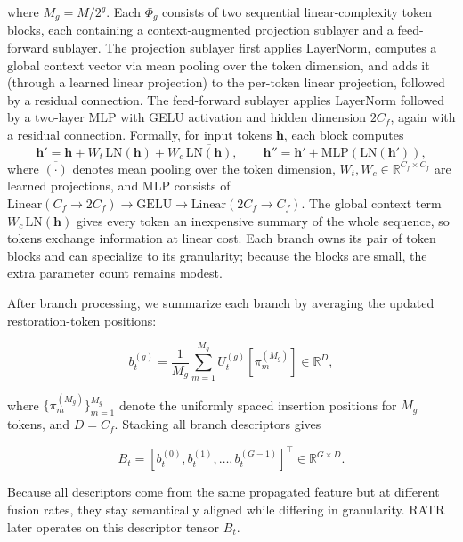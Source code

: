 where $M_g = M/2^g$. Each $\Phi_g$ consists of two sequential linear-complexity token blocks, each containing a context-augmented projection sublayer and a feed-forward sublayer. The projection sublayer first applies LayerNorm, computes a global context vector via mean pooling over the token dimension, and adds it (through a learned linear projection) to the per-token linear projection, followed by a residual connection. The feed-forward sublayer applies LayerNorm followed by a two-layer MLP with GELU activation and hidden dimension $2C_f$, again with a residual connection. Formally, for input tokens $\mathbf{h}$, each block computes
\begin{equation}
\mathbf{h}' = \mathbf{h} + W_t\,\mathrm{LN}(\mathbf{h}) + W_c\,\overline{\mathrm{LN}(\mathbf{h})},\qquad
\mathbf{h}'' = \mathbf{h}' + \mathrm{MLP}(\mathrm{LN}(\mathbf{h}')),
\end{equation}
where $\overline{(\cdot)}$ denotes mean pooling over the token dimension, $W_t,W_c\in\mathbb{R}^{C_f\times C_f}$ are learned projections, and MLP consists of $\mathrm{Linear}(C_f\!\rightarrow\!2C_f)\!\rightarrow\!\mathrm{GELU}\!\rightarrow\!\mathrm{Linear}(2C_f\!\rightarrow\!C_f)$. The global context term $W_c\,\overline{\mathrm{LN}(\mathbf{h})}$ gives every token an inexpensive summary of the whole sequence, so tokens exchange information at linear cost. Each branch owns its pair of token blocks and can specialize to its granularity; because the blocks are small, the extra parameter count remains modest.

After branch processing, we summarize each branch by averaging the updated restoration-token positions:

\begin{equation}
b_t^{(g)} =
\frac{1}{M_g}
\sum_{m=1}^{M_g}
U_t^{(g)}[\pi_m^{(M_g)}]
\in \mathbb{R}^{D},
\end{equation}

where $\{\pi_m^{(M_g)}\}_{m=1}^{M_g}$ denote the uniformly spaced insertion positions for $M_g$ tokens, and $D=C_f$. Stacking all branch descriptors gives

\begin{equation}
B_t =
\left[
b_t^{(0)}, b_t^{(1)}, \ldots, b_t^{(G-1)}
\right]^\top
\in \mathbb{R}^{G \times D}.
\end{equation}

Because all descriptors come from the same propagated feature but at different fusion rates, they stay semantically aligned while differing in granularity. RATR later operates on this descriptor tensor $B_t$.

